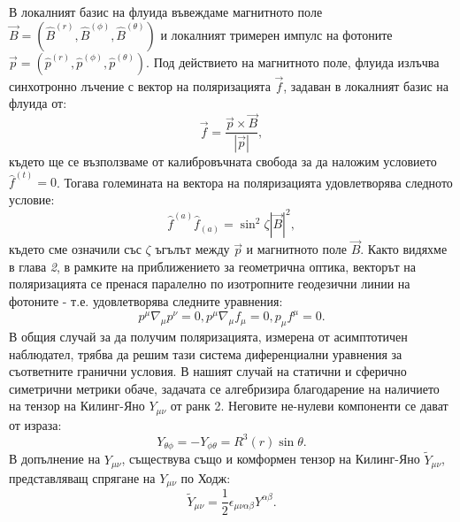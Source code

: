 В локалният базис на флуида въвеждаме магнитното поле $\vec{B} = (\hat{B}^{(r)},\hat{B}^{(\phi)},\hat{B}^{(\theta)})$ и локалният тримерен импулс на фотоните $\vec{p} = \left(\hat{p}^{(r)},\hat{p}^{(\phi)},\hat{p}^{(\theta)}\right)$. Под действието на магнитното поле, флуида излъчва синхотронно лъчение с вектор на поляризацията $\vec{f}$, задаван в локалният базис на флуида от:
\begin{equation}
	\vec{f} = \frac{\vec{p}\times\vec{B}}{|\vec{p}|},
\end{equation}
където ще се възползваме от калибровъчната свобода за да наложим условието $\hat{f}^{(t)} = 0$. Тогава големината на вектора на поляризацията удовлетворява следното условие:
\begin{equation}
	\hat{f}^{(a)}\hat{f}_{(a)} = \sin^2\zeta|\vec{B}|^2,
\end{equation}
където сме означили със $\zeta$ ъгълът между $\vec{p}$ и магнитното поле $\vec{B}$. Както видяхме в глава \emph{2}, в рамките на приближението за геометрична оптика, векторът на поляризацията се пренася паралелно по изотропните геодезични линии на фотоните - т.е. удовлетворява следните уравнения:
\begin{subequations}
	\begin{equation}
		p^\mu\nabla_\mu p^\nu = 0,
	\end{equation}
	\begin{equation}
		p^\mu\nabla_\mu f_\mu = 0,
	\end{equation}
	\begin{equation}
		p_\mu f^\mu = 0.
	\end{equation}
\end{subequations}
В общия случай за да получим поляризацията, измерена от асимптотичен наблюдател, трябва да решим тази система диференциални уравнения за съответните гранични условия. В нашият случай на статични и сферично симетрични метрики обаче, задачата се алгебризира благодарение на наличието на тензор на Килинг-Яно $Y_{\mu\nu}$ от ранк 2. Неговите не-нулеви компоненти се дават от израза:
\begin{equation}
	Y_{\theta\phi} = -Y_{\phi\theta} = R^3(r)\sin\theta.
\end{equation} 
В допълнение на $Y_{\mu\nu}$, съществува също и комформен тензор на Килинг-Яно $\tilde{Y}_{\mu\nu}$, представляващ спрягане на $Y_{\mu\nu}$ по Ходж:
\begin{equation}
	\tilde{Y}_{\mu\nu} = \frac{1}{2}\epsilon_{\mu\nu\alpha\beta}Y^{\alpha\beta}.
\end{equation}
